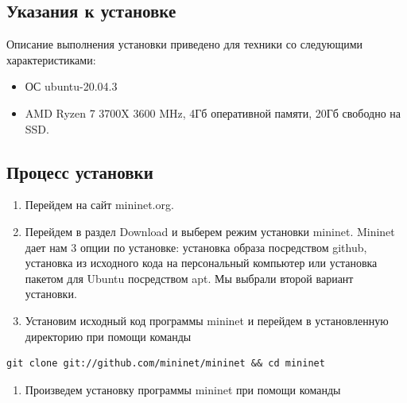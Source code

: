 \documentclass[
  13pt,
  fontsize=13pt,
  russian,
  a4paper,
,captions=tableheading
]{scrreprt}
\providecommand{\tightlist}{%
  \setlength{\itemsep}{0pt}\setlength{\parskip}{0pt}}
\begin{document}
\hypertarget{ux443ux43aux430ux437ux430ux43dux438ux44f-ux43a-ux443ux441ux442ux430ux43dux43eux432ux43aux435}{%
\subsection{Указания к
установке}\label{ux443ux43aux430ux437ux430ux43dux438ux44f-ux43a-ux443ux441ux442ux430ux43dux43eux432ux43aux435}}

Описание выполнения установки приведено для техники со следующими
характеристиками:

\begin{itemize}
\tightlist
\item
  ОС ubuntu-20.04.3
\item
  AMD Ryzen 7 3700X 3600 MHz, 4Гб оперативной памяти, 20Гб свободно на
  SSD.
\end{itemize}

\hypertarget{ux43fux440ux43eux446ux435ux441ux441-ux443ux441ux442ux430ux43dux43eux432ux43aux438}{%
\subsection{Процесс
установки}\label{ux43fux440ux43eux446ux435ux441ux441-ux443ux441ux442ux430ux43dux43eux432ux43aux438}}

\begin{enumerate}
\def\labelenumi{\arabic{enumi}.}
\item
  Перейдем на сайт mininet.org.
\item
  Перейдем в раздел Download и выберем режим установки mininet. Mininet
  дает нам 3 опции по установке: установка образа посредством github,
  установка из исходного кода на персональный компьютер или установка
  пакетом для Ubuntu посредством apt. Мы выбрали второй вариант
  установки.
\item
  Установим исходный код программы mininet и перейдем в установленную
  директорию при помощи команды
\end{enumerate}

\begin{verbatim}
git clone git://github.com/mininet/mininet && cd mininet
\end{verbatim}

\begin{enumerate}
\def\labelenumi{\arabic{enumi}.}
\setcounter{enumi}{3}
\tightlist
\item
  Произведем установку программы mininet при помощи команды
\end{enumerate}
\end{document}
